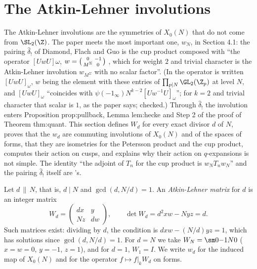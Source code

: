 \section{The Atkin-Lehner involutions}\label{sec:modforms:atkin-lehner}

The Atkin-Lehner involutions are the symmetries of $X_0(N)$ that do not come from $\SL_2(\Z)$. The paper meets the most important one, $w_N$, in Section 4.1: the pairing $\hat\delta_!$
of Diamond, Flach and Guo is the cup product composed with ``the operator $[UwU]\omega$, $w=\begin{psmallmatrix}0&-1\\M^\Sigma&0\end{psmallmatrix}$ \cite[(13), (14)]{DFG04},
which for weight $2$ and trivial character is the Atkin-Lehner involution $w_{M^\Sigma}$ with no scalar factor''. (In \cite[Section 1.5.3]{DFG04} the operator is written $[UwU]_\omega$, $w$ being the element with these entries of $\prod_{p\mid N}\GL_2(\Z_p)$
at level $N$, and $[UwU]_\omega$ ``coincides with $\psi(-1_\infty)N^{k-2}[Uw^{-1}U]_\omega$''; for $k=2$ and trivial character that scalar is $1$, as the paper says; checked.) Through $\hat\delta_!$ the involution enters Proposition prop:pullback,
Lemma lem:hecke and Step 2 of the proof of Theorem thm:quant. This section defines $W_d$ for every exact divisor $d$ of $N$, proves that the $w_d$ are commuting involutions of
$X_0(N)$ and of the spaces of forms, that they are isometries for the Petersson product and the cup product, computes their action on cusps, and explains why their action
on $q$-expansions is not simple. The identity ``the adjoint of $T_n$ for the cup product is $w_NT_nw_N$'' and the pairing $\hat\delta_!$ itself are 's.

\begin{definition}\label{def:modforms:atkin-lehner}
Let $d\,\|\,N$, that is, $d\mid N$ and $\gcd(d,N/d)=1$. An \emph{Atkin-Lehner matrix} for $d$ is an integer matrix
\[
W_d=\begin{pmatrix}dx&y\\Nz&dw\end{pmatrix},\qquad\det W_d=d^2xw-Nyz=d .
\]
Such matrices exist: dividing by $d$, the condition is $dxw-(N/d)yz=1$, which has solutions since $\gcd(d,N/d)=1$. For $d=N$ we take $W_N=\sm0{-1}N0$ ($x=w=0$, $y=-1$, $z=1$), and for
$d=1$, $W_1=I$. We write $w_d$ for the induced map of $X_0(N)$ and for the operator $f\mapsto f|_kW_d$ on forms.
\end{definition}

